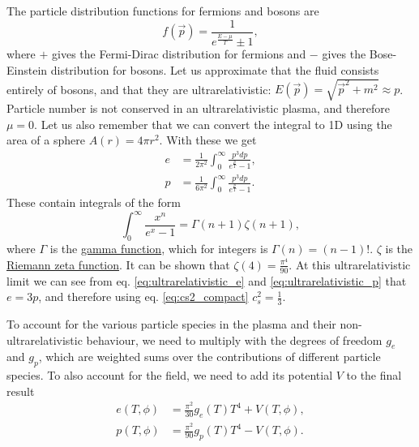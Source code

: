 The particle distribution functions for fermions and bosons are
\cite[eq. 4.6]{lecture_notes}
\begin{equation}
f(\vec{p}) = \frac{1}{e^\frac{E-\mu}{T} \pm 1},
\end{equation}
where $+$ gives the Fermi-Dirac distribution for fermions and $-$ gives the Bose-Einstein distribution for bosons.
Let us approximate that the fluid consists entirely of bosons,
and that they are ultrarelativistic: $E(\vec{p}) = \sqrt{\vec{p}^2 + m^2} \approx p$.
Particle number is not conserved in an ultrarelativistic plasma, and therefore $\mu = 0$.
Let us also remember that we can convert the integral to 1D using the area of a sphere $A(r) = 4\pi r^2$.
With these we get
\begin{align}
e &= \frac{1}{2 \pi^2} \int_0^\infty \frac{p^3 dp}{e^\frac{p}{T} - 1},
\label{eq:ultrarelativistic_e} \\
p &= \frac{1}{6 \pi^2} \int_0^\infty \frac{p^3 dp}{e^\frac{p}{T} - 1}.
\label{eq:ultrarelativistic_p}
\end{align}
These contain integrals of the form
\cite[eq. B.36]{schroeder_thermal_2000}
\begin{equation}
\int_0^\infty \frac{x^n}{e^x - 1} = \Gamma(n+1) \zeta(n+1),
\end{equation}
where $\Gamma$ is the
\href{https://en.wikipedia.org/wiki/Gamma_function}{gamma function}, which for integers is $\Gamma(n) = (n-1)!$.
$\zeta$ is the
\href{https://en.wikipedia.org/wiki/Riemann_zeta_function}{Riemann zeta function}.
It can be shown that $\zeta(4) = \frac{\pi^4}{90}$.
\cite[prob. B.19]{schroeder_thermal_2000}
At this ultrarelativistic limit we can see from eq. \eqref{eq:ultrarelativistic_e} and \eqref{eq:ultrarelativistic_p} that $e = 3p$, and therefore using eq. \eqref{eq:cs2_compact} $c_s^2 = \frac{1}{3}$.

To account for the various particle species in the plasma and their non-ultrarelativistic behaviour,
we need to multiply with the degrees of freedom $g_e$ and $g_p$,
which are weighted sums over the contributions of different particle species.
To also account for the field, we need to add its potential $V$ to the final result
\cite[eq. S12]{borsanyi_lattice_2016}
\begin{align}
e(T,\phi) &= \frac{\pi^2}{30} g_e(T) T^4 + V(T,\phi),
\label{eq:e_general} \\
p(T,\phi) &= \frac{\pi^2}{90} g_p(T) T^4 - V(T,\phi).
\label{eq:p_general}
\end{align}

